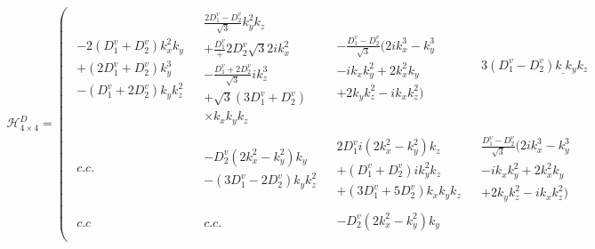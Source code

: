 \begin{align}
\mathcal{H}_{4\times4}^{D} =\left(
 \begin{array}{c|c|c|c}
\begin{array}{c}
-2(D_1^v +D_2^v)k_x^2k_y\\
+(2D_1^v +D_2^v)k_y^3\\
-(D_1^v +2D_2^v)k_yk_z^2
\end{array}
&\begin{array}{c}
\frac{2D_1^v -D_2^v}{\sqrt{3}}k_y^2k_z\\
+\frac{D_1^v} +2D_2^v{\sqrt{3}}2ik_x^2\\
-\frac{D_1^v +2D_2^v}{\sqrt{3}}ik_z^3\\
+\sqrt{3}(3D_1^v +D_2^v)\\
\times k_xk_yk_z
\end{array}
&\begin{array}{c}
-\frac{D_1^v -D_2^v}{\sqrt{3}}(2ik_x^3 -k_y^3\\
-ik_xk_y^2 +2k_x^2k_y\\
+2k_yk_z^2 -ik_xk_z^2)
\end{array}
&\begin{array}{c}
3(D_1^v -D_2^v)k_\_ k_yk_z\\
\end{array}
\\ \hline
\begin{array}{c}
c.c.
\end{array}
&\begin{array}{c}
-D_2^v(2k_x^2-k_y^2)k_y\\
-(3D_1^v -2D_2^v)k_yk_z^2
\end{array}
&\begin{array}{c}
2D_1^vi(2k_x^2 -k_y^2)k_z\\
+(D_1^v +D_2^v)ik_y^2k_z\\
+(3D_1^v +5D_2^v)k_xk_yk_z
\end{array}
&\begin{array}{c}
\frac{D_1^v -D_2^v}{\sqrt{3}}(2ik_x^3 -k_y^3\\
-ik_xk_y^2 +2k_x^2k_y\\
+2k_yk_z^2 -ik_xk_z^2)
\end{array}
\\ \hline
\begin{array}{c}
c.c
\end{array}
&\begin{array}{c}
c.c.
\end{array}
&\begin{array}{c}
 -D_2^v(2k_x^2-k_y^2)k_y\\

\end{array}
\end{array}
\end{align}
